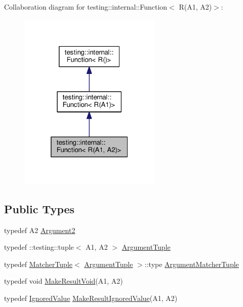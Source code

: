 Collaboration diagram for testing\+:\+:internal\+:\+:Function$<$ R(A1, A2)$>$\+:\nopagebreak
\begin{figure}[H]
\begin{center}
\leavevmode
\includegraphics[width=193pt]{structtesting_1_1internal_1_1Function_3_01R_07A1_00_01A2_08_4__coll__graph}
\end{center}
\end{figure}
\subsection*{Public Types}
\begin{DoxyCompactItemize}
\item 
typedef A2 \hyperlink{structtesting_1_1internal_1_1Function_3_01R_07A1_00_01A2_08_4_a025f5192252366d73aa19718bb0ea89d}{Argument2}
\item 
typedef \+::testing\+::tuple$<$ A1, A2 $>$ \hyperlink{structtesting_1_1internal_1_1Function_3_01R_07A1_00_01A2_08_4_a2de00437877c29ec6cb78396928b8e3e}{Argument\+Tuple}
\item 
typedef \hyperlink{structtesting_1_1internal_1_1MatcherTuple}{Matcher\+Tuple}$<$ \hyperlink{structtesting_1_1internal_1_1Function_3_01R_07_08_4_ad483c3128c470d8cdb55c3ac1c575c11}{Argument\+Tuple} $>$\+::type \hyperlink{structtesting_1_1internal_1_1Function_3_01R_07A1_00_01A2_08_4_ad07042129ff6370f55a279ad12f5e80f}{Argument\+Matcher\+Tuple}
\item 
typedef void \hyperlink{structtesting_1_1internal_1_1Function_3_01R_07A1_00_01A2_08_4_ada1ad22fa21c84ec3faea47ed20c1b46}{Make\+Result\+Void}(A1, A2)
\item 
typedef \hyperlink{classtesting_1_1internal_1_1IgnoredValue}{Ignored\+Value} \hyperlink{structtesting_1_1internal_1_1Function_3_01R_07A1_00_01A2_08_4_a89033ea870fe831b13899ce36666e102}{Make\+Result\+Ignored\+Value}(A1, A2)
\end{DoxyCompactItemize}


